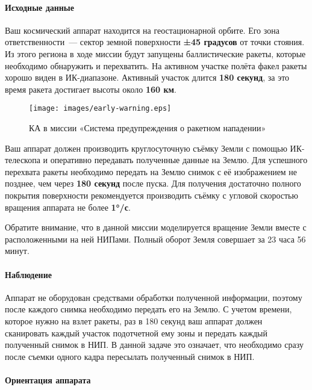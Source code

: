 \documentclass[12pt,a4paper]{article}
\begin{document}
\paragraph{Исходные данные}

Ваш космический аппарат находится на геостационарной орбите. Его зона ответственности~---
сектор земной поверхности \textbf{±45 градусов} от точки стояния. Из этого региона в ходе
миссии будут запущены баллистические ракеты, которые необходимо обнаружить и
перехватить. На активном участке полёта факел ракеты хорошо виден в ИК-диапазоне. Активный
участок длится \textbf{180 секунд}, за это время ракета достигает высоты около \textbf{160
  км}.

\begin{figure}[tbh]
  \begin{center}
    \texttt{[image: images/early-warning.eps]}
    \caption{КА в миссии «Система предупреждения о ракетном нападении»}
    \label{Pic:EWarning}
  \end{center}
\end{figure}

Ваш аппарат должен производить круглосуточную съёмку Земли с помощью ИК-телескопа и
оперативно передавать полученные данные на Землю. Для успешного перехвата ракеты
необходимо передать на Землю снимок с её изображением не позднее, чем через \textbf{180
  секунд} после пуска. Для получения достаточно полного покрытия поверхности рекомендуется
производить съёмку с угловой скоростью вращения аппарата не более \textbf{1°/с}.

Обратите внимание, что в данной миссии моделируется вращение Земли вместе с расположенными
на ней НИПами. Полный оборот Земля совершает за 23 часа 56 минут.

\paragraph{Наблюдение}

Аппарат не оборудован средствами обработки полученной информации, поэтому после каждого
снимка необходимо передать его на Землю. С учетом времени, которое нужно на взлет ракеты,
раз в 180 секунд ваш аппарат должен сканировать каждый участок подотчетной ему зоны и
передать каждый полученный снимок в НИП. В данной задаче это означает, что необходимо
сразу после съемки одного кадра пересылать полученный снимок в НИП.

\paragraph{Ориентация аппарата}
\end{document}
